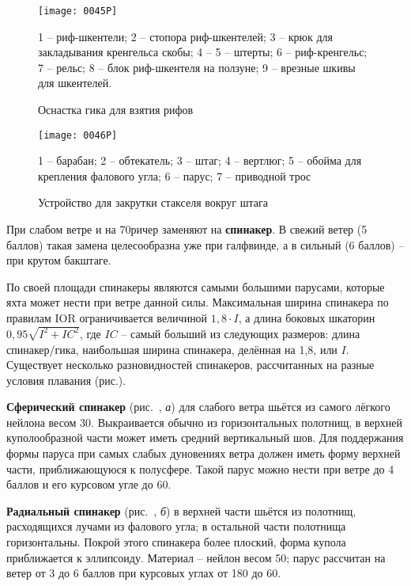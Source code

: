 \begin{figure*}[htb]
  \centering{}
  \texttt{[image: 0045P]}
  \caption{Оснастка гика для взятия рифов}
  \label{fig:45}
  \small
  1 \--- риф-шкентели; 2 \---  стопора риф-шкентелей; 3 \--- крюк для закладывания кренгельса скобы; 4 \--- 5 \--- штерты; 6 \--- риф-кренгельс; 7 \--- рельс; 8 \--- блок риф-шкентеля на ползуне; 9 \--- врезные шкивы для шкентелей. 
\end{figure*}

\begin{figure}[htb]
  \centering{}
  \texttt{[image: 0046P]}
  \caption{Устройство для закрутки стакселя вокруг штага}
  \label{fig:46}
  \small
  1 \--- барабан; 2 \--- обтекатель; 3 \--- штаг; 4 \--- вертлюг; 5 \--- обойма для крепления фалового угла; 6 \--- парус; 7 \--- приводной трос
\end{figure}

При слабом ветре и на 70\gr ричер заменяют на \textbf{спинакер}. В
свежий ветер (5 баллов) такая замена целесообразна уже при галфвинде,
а в сильный (6 баллов) \--- при крутом бакштаге.

По своей площади спинакеры являются самыми большими парусами, которые
яхта может нести при ветре данной силы. Максимальная ширина спинакера
по правилам IOR ограничивается величиной $1,8 \cdot I$, а длина
боковых шкаторин $0,95 \sqrt{I^2 + IC^2}$, где $IC$ \--- самый больший
из следующих размеров: длина спинакер\-/гика, наибольшая ширина
спинакера, делённая на 1,8, или $I$. Существует несколько
разновидностей спинакеров, рассчитанных на разные условия плавания
(рис.).

\textbf{Сферический спинакер}
(рис.~, \textit{а}) для слабого ветра шьётся из самого лёгкого
нейлона весом 30\gmsq. Выкраивается обычно из горизонтальных полотнищ,
в верхней куполообразной части может иметь средний вертикальный
шов. Для поддержания формы паруса при самых слабых дуновениях ветра
должен иметь форму верхней части, приближающуюся к полусфере. Такой
парус можно нести при ветре до 4 баллов и его курсовом угле до 60\gr.

\textbf{Радиальный спинакер}
(рис.~, \textit{б}) в верхней части шьётся из полотнищ,
расходящихся лучами из фалового угла; в остальной части полотнища
горизонтальны. Покрой этого спинакера более плоский, форма купола
приближается к эллипсоиду. Материал \--- нейлон весом 50\gmsq;
парус рассчитан на ветер от 3 до 6 баллов при курсовых углах от 180\gr
до 60\gr.

